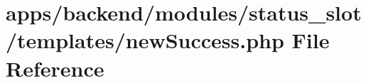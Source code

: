 \hypertarget{backend_2modules_2status__slot_2templates_2new_success_8php}{\section{apps/backend/modules/status\-\_\-slot/templates/new\-Success.php File Reference}
\label{backend_2modules_2status__slot_2templates_2new_success_8php}
}

